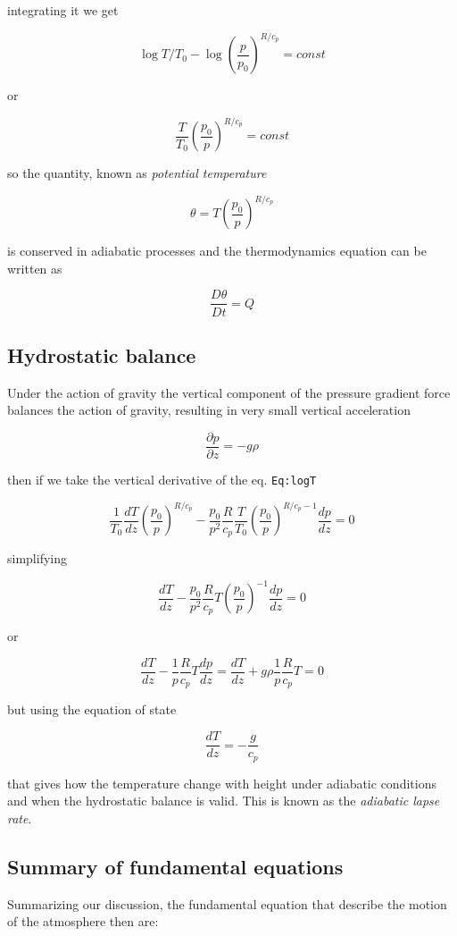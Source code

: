 integrating it we get

\[\log{T/T_0} - \log{\left(\frac{p}{p_0}\right)^{R/c_p}} = const\]

or

\[\frac{T}{T_0}\left(\frac{p_0}{p}\right)^{R/c_p} = const\]

so the quantity, known as \emph{potential temperature}

\[\theta = T\left(\frac{p_0}{p}\right)^{R/c_p}\]

is conserved in adiabatic processes and the thermodynamics equation can
be written as

\[\frac{D \theta}{Dt} = Q\]

\subsection{Hydrostatic balance}\label{hydrostatic-balance}

Under the action of gravity the vertical component of the pressure
gradient force balances the action of gravity, resulting in very small
vertical acceleration

\[\frac{\partial p}{\partial z} =  -g \rho\]

then if we take the vertical derivative of the eq. \texttt{Eq:logT}

\[\frac{1}{T_0}\frac{d T}{dz}\left(\frac{p_0}{p}\right)^{R/c_p} -\frac{p_0}{p^2}\frac{R}{c_p}\frac{T}{T_0}\left(\frac{p_0}{p}\right)^{R/c_p-1}\frac{d p}{dz} = 0\]

simplifying

\[\frac{d T}{dz} -\frac{p_0}{p^2}\frac{R}{c_p}T\left(\frac{p_0}{p}\right)^{-1}\frac{d p}{dz} = 0\]

or

\[\frac{d T}{dz} -\frac{1}{p}\frac{R}{c_p}T\frac{d p}{dz} = \frac{d T}{dz} +g\rho\frac{1}{p}\frac{R}{c_p}T = 0\]

but using the equation of state

\[\frac{d T}{dz} = -\frac{g}{c_p}\]

that gives how the temperature change with height under adiabatic
conditions and when the hydrostatic balance is valid. This is known as
the \emph{adiabatic lapse rate}.

\subsection{Summary of fundamental
equations}\label{summary-of-fundamental-equations}

Summarizing our discussion, the fundamental equation that describe the
motion of the atmosphere then are:

